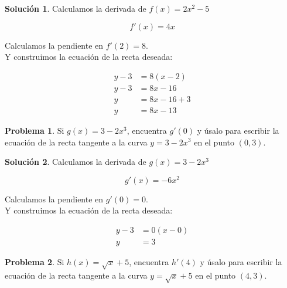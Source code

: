 \documentclass{article}
\theoremstyle{definition}
\newtheorem{problem}{Problema}
\newtheorem*{solution}{Solución}
\begin{document}
\begin{solution}

Calculamos la derivada de \( f(x)= 2x^2 - 5 \)

\[
f'(x) = 4x
\]

Calculamos la pendiente en \( f'(2) = 8 \). \\

Y construimos la ecuación de la recta deseada:

\begin{align*}
    y - 3 &= 8(x-2) \\
    y - 3 &= 8x - 16 \\
    y &= 8x - 16 + 3 \\
    y &= 8x - 13
\end{align*}

\end{solution}

\bigskip

\begin{problem}
Si \( g(x) = 3 - 2x^3 \), encuentra \( g'(0) \) y úsalo para escribir la ecuación de la recta tangente a la curva \( y = 3 - 2x^3 \) en el punto \( (0,3) \).
\end{problem}

\medskip

\begin{solution}

Calculamos la derivada de \( g(x) = 3 - 2x^3 \)

\[
g'(x) = -6x^2
\]

Calculamos la pendiente en \( g'(0) = 0 \). \\

Y construimos la ecuación de la recta deseada:

\begin{align*}
    y - 3 &= 0(x-0) \\
    y &= 3
\end{align*}

\end{solution}

\bigskip

\begin{problem}
Si \( h(x) = \sqrt{x} + 5 \), encuentra \( h'(4) \) y úsalo para escribir la ecuación de la recta tangente a la curva \( y = \sqrt{x} + 5 \) en el punto \( (4,3) \).
\end{problem}

\medskip
\end{document}
